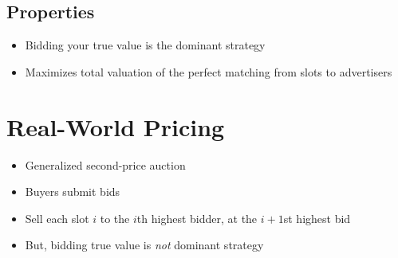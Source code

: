 \subsection{Properties}
\begin{itemize}
    \item Bidding your true value is the dominant strategy
    \item Maximizes total valuation of the perfect matching from slots to advertisers
\end{itemize}

\section{Real-World Pricing}

\begin{itemize}
    \item Generalized second-price auction
    \item Buyers submit bids
    \item Sell each slot $i$ to the $i$th highest bidder, at the $i + 1$st highest bid
    \item But, bidding true value is \emph{not} dominant strategy
\end{itemize}